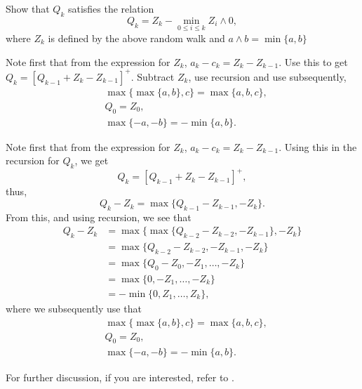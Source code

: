 \begin{exercise}
Show that  $Q_k$ satisfies the relation
\begin{equation}\label{eq:reich1}
  Q_k = Z_k - \min_{0\leq i \leq k} Z_i\wedge 0,
\end{equation}
where $Z_k$ is defined by the above random walk and
$a\wedge b = \min\{a,b\}$ 

\begin{hint}
Note first that from the expression for $Z_k$,
  $a_k - c_k = Z_k - Z_{k-1}$. Use this to get
  $Q_k = [Q_{k-1} +Z_k- Z_{k-1}]^+$. Subtract $Z_k$, use recursion and
  use subsequently,
\begin{align*}
&\max\{\max\{a,b\}, c\} = \max\{a,b,c\}, \\
&Q_0 = Z_0, \\
&\max\{-a, -b \} = -\min\{a,b\}.
\end{align*}
\end{hint}
 
\begin{solution}
Note first that from the expression
for $Z_k$, $a_k - c_k = Z_k - Z_{k-1}$. Using this in the recursion
for $Q_k$, we get
\begin{equation*}
  Q_k = [Q_{k-1} +Z_k- Z_{k-1}]^+,
\end{equation*}
thus, 
\begin{equation*}
  Q_k - Z_{k} = \max\{Q_{k-1} - Z_{k-1}, -Z_k\}.
\end{equation*}
From this, and using recursion, we see that
\begin{equation*}
  \begin{split}
  Q_k - Z_{k} 
&= \max\{\max\{Q_{k-2} - Z_{k-2}, -Z_{k-1}\}, -Z_k\} \\
&= \max\{Q_{k-2} - Z_{k-2}, -Z_{k-1}, -Z_k\} \\
&= \max\{Q_{0} - Z_{0}, -Z_1, \ldots, -Z_k\} \\
&= \max\{0, -Z_1, \ldots, -Z_k\} \\
&= - \min\{0, Z_1, \ldots, Z_k\},
  \end{split}
  \end{equation*}
where we subsequently use that
\begin{align*}
&\max\{\max\{a,b\}, c\} = \max\{a,b,c\}, \\
&Q_0 = Z_0, \\
&\max\{-a, -b \} = -\min\{a,b\}.
\end{align*}
 
For further discussion, if you are interested, refer to
  \citet{baccelli88:_sampl_m_m}.
\end{solution}
\end{exercise}

